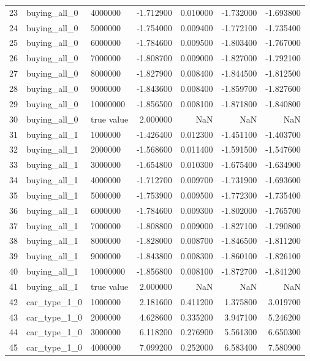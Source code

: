 \begin{tabular}{lllrrrr}
23 & buying_all_0 & 4000000 & -1.712900 & 0.010000 & -1.732000 & -1.693800 \\
24 & buying_all_0 & 5000000 & -1.754000 & 0.009400 & -1.772100 & -1.735400 \\
25 & buying_all_0 & 6000000 & -1.784600 & 0.009500 & -1.803400 & -1.767000 \\
26 & buying_all_0 & 7000000 & -1.808700 & 0.009000 & -1.827000 & -1.792100 \\
27 & buying_all_0 & 8000000 & -1.827900 & 0.008400 & -1.844500 & -1.812500 \\
28 & buying_all_0 & 9000000 & -1.843600 & 0.008400 & -1.859700 & -1.827600 \\
29 & buying_all_0 & 10000000 & -1.856500 & 0.008100 & -1.871800 & -1.840800 \\
30 & buying_all_0 & true value & 2.000000 & NaN & NaN & NaN \\
31 & buying_all_1 & 1000000 & -1.426400 & 0.012300 & -1.451100 & -1.403700 \\
32 & buying_all_1 & 2000000 & -1.568600 & 0.011400 & -1.591500 & -1.547600 \\
33 & buying_all_1 & 3000000 & -1.654800 & 0.010300 & -1.675400 & -1.634900 \\
34 & buying_all_1 & 4000000 & -1.712700 & 0.009700 & -1.731900 & -1.693600 \\
35 & buying_all_1 & 5000000 & -1.753900 & 0.009500 & -1.772300 & -1.735400 \\
36 & buying_all_1 & 6000000 & -1.784600 & 0.009300 & -1.802000 & -1.765700 \\
37 & buying_all_1 & 7000000 & -1.808800 & 0.009000 & -1.827100 & -1.790800 \\
38 & buying_all_1 & 8000000 & -1.828000 & 0.008700 & -1.846500 & -1.811200 \\
39 & buying_all_1 & 9000000 & -1.843800 & 0.008300 & -1.860100 & -1.826100 \\
40 & buying_all_1 & 10000000 & -1.856800 & 0.008100 & -1.872700 & -1.841200 \\
41 & buying_all_1 & true value & 2.000000 & NaN & NaN & NaN \\
42 & car_type_1_0 & 1000000 & 2.181600 & 0.411200 & 1.375800 & 3.019700 \\
43 & car_type_1_0 & 2000000 & 4.628600 & 0.335200 & 3.947100 & 5.246200 \\
44 & car_type_1_0 & 3000000 & 6.118200 & 0.276900 & 5.561300 & 6.650300 \\
45 & car_type_1_0 & 4000000 & 7.099200 & 0.252000 & 6.583400 & 7.580900 \\

\end{tabular}
